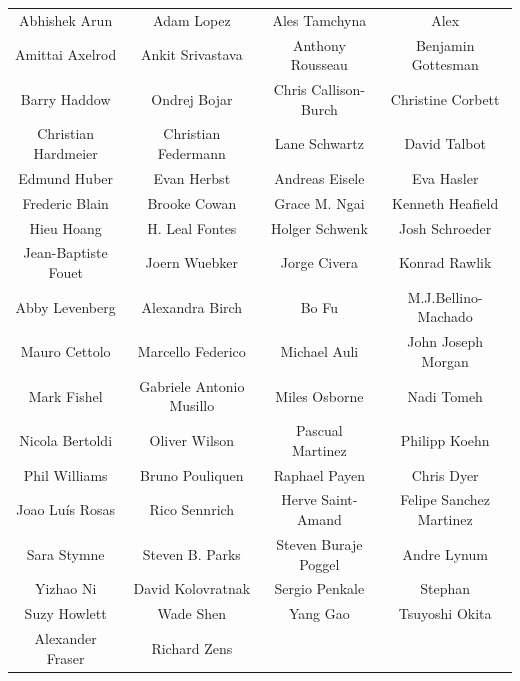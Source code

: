 \documentclass[landscape]{uedslides2C}
\begin{document}
\vspace{10mm}
\begin{center}
\footnotesize \rm
\begin{tabular}{cccc} 
Abhishek Arun & 
Adam Lopez & 
Ales Tamchyna & 
Alex \\
Amittai Axelrod &
Ankit Srivastava &
Anthony Rousseau &
Benjamin Gottesman \\ 
Barry Haddow &
Ondrej Bojar &
Chris Callison-Burch & 
Christine Corbett \\
Christian Hardmeier &
Christian Federmann &
Lane Schwartz &
David Talbot \\
Edmund Huber &
Evan Herbst &
Andreas Eisele &
Eva Hasler \\
Frederic Blain &
Brooke Cowan &
Grace M. Ngai&
Kenneth Heafield \\
Hieu Hoang &
H. Leal Fontes &
Holger Schwenk &
Josh Schroeder \\
Jean-Baptiste Fouet &
Joern Wuebker &
Jorge Civera &
Konrad Rawlik \\
Abby Levenberg &
Alexandra Birch &
Bo Fu &
M.J.Bellino-Machado \\
Mauro Cettolo &
Marcello Federico &
Michael Auli &
John Joseph Morgan \\
Mark Fishel &
Gabriele Antonio Musillo &
Miles Osborne &
Nadi Tomeh \\
Nicola Bertoldi &
Oliver Wilson &
Pascual Martinez &
Philipp Koehn \\
Phil Williams &
Bruno Pouliquen &
Raphael Payen &
Chris Dyer \\
Joao Luís Rosas &
Rico Sennrich &
Herve Saint-Amand &
Felipe Sanchez Martinez \\
Sara Stymne &
Steven B. Parks &
Steven Buraje Poggel &
Andre Lynum \\
Yizhao Ni &
David Kolovratnak &
Sergio Penkale &
Stephan \\
Suzy Howlett &
Wade Shen &
Yang Gao &
Tsuyoshi Okita \\
Alexander Fraser &
Richard Zens

\end{tabular}
\end{center}

\end{document}
